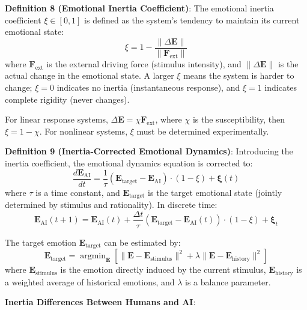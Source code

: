 \documentclass[12pt,a4paper]{article}
\theoremstyle{plain}
\newcommand{\ve}[1]{\bm{#1}}                    %
\newcommand{\Evec}{\ve{E}}                        %
\DeclareMathOperator*{\argmin}{argmin}
\begin{document}
\textbf{Definition 8 (Emotional Inertia Coefficient)}: The emotional inertia coefficient $\xi \in [0,1]$ is defined as the system's tendency to maintain its current emotional state:
\begin{equation}
\xi = 1 - \frac{\|\Delta \Evec\|}{\|\ve{F}_{\text{ext}}\|}
\label{eq:inertia}
\end{equation}
where $\ve{F}_{\text{ext}}$ is the external driving force (stimulus intensity), and $\|\Delta \Evec\|$ is the actual change in the emotional state. A larger $\xi$ means the system is harder to change; $\xi=0$ indicates no inertia (instantaneous response), and $\xi=1$ indicates complete rigidity (never changes).

For linear response systems, $\Delta \Evec = \chi \ve{F}_{\text{ext}}$, where $\chi$ is the susceptibility, then $\xi = 1 - \chi$. For nonlinear systems, $\xi$ must be determined experimentally.

\textbf{Definition 9 (Inertia-Corrected Emotional Dynamics)}: Introducing the inertia coefficient, the emotional dynamics equation is corrected to:
\begin{equation}
\frac{d\Evec_{\text{AI}}}{dt} = \frac{1}{\tau} (\Evec_{\text{target}} - \Evec_{\text{AI}}) \cdot (1 - \xi) + \boldsymbol{\xi}(t)
\label{eq:inertia_dynamics}
\end{equation}
where $\tau$ is a time constant, and $\Evec_{\text{target}}$ is the target emotional state (jointly determined by stimulus and rationality). In discrete time:
\begin{equation}
\Evec_{\text{AI}}(t+1) = \Evec_{\text{AI}}(t) + \frac{\Delta t}{\tau} (\Evec_{\text{target}} - \Evec_{\text{AI}}(t)) \cdot (1 - \xi) + \boldsymbol{\xi}_t
\label{eq:discrete_inertia}
\end{equation}

The target emotion $\Evec_{\text{target}}$ can be estimated by:
\begin{equation}
\Evec_{\text{target}} = \argmin_{\Evec} \left[ \| \Evec - \Evec_{\text{stimulus}} \|^2 + \lambda \| \Evec - \Evec_{\text{history}} \|^2 \right]
\label{eq:target}
\end{equation}
where $\Evec_{\text{stimulus}}$ is the emotion directly induced by the current stimulus, $\Evec_{\text{history}}$ is a weighted average of historical emotions, and $\lambda$ is a balance parameter.

\textbf{Inertia Differences Between Humans and AI}:
\end{document}
